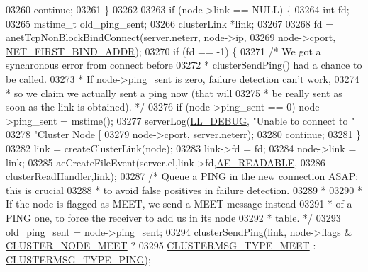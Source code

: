 \begin{DoxyCode}
{{{{{{{{{{{{{{{{{{{{{{{{{{{{{{{{{{{{{{{{{{{{{{{{{{{{{{{{{03260             \textcolor{keywordflow}{continue};
03261         \}
03262 
03263         \textcolor{keywordflow}{if} (node->link == NULL) \{
03264             \textcolor{keywordtype}{int} fd;
03265             mstime\_t old\_ping\_sent;
03266             clusterLink *link;
03267 
03268             fd = anetTcpNonBlockBindConnect(server.neterr, node->ip,
03269                 node->cport, \hyperlink{server_8h_a53b900c09238a4ff78e0af9574335dfd}{NET\_FIRST\_BIND\_ADDR});
03270             \textcolor{keywordflow}{if} (fd == -1) \{
03271                 \textcolor{comment}{/* We got a synchronous error from connect before}
03272 \textcolor{comment}{                 * clusterSendPing() had a chance to be called.}
03273 \textcolor{comment}{                 * If node->ping\_sent is zero, failure detection can't work,}
03274 \textcolor{comment}{                 * so we claim we actually sent a ping now (that will}
03275 \textcolor{comment}{                 * be really sent as soon as the link is obtained). */}
03276                 \textcolor{keywordflow}{if} (node->ping\_sent == 0) node->ping\_sent = mstime();
03277                 serverLog(\hyperlink{server_8h_abcaffe365dee628fcf9fc90c69d534a1}{LL\_DEBUG}, \textcolor{stringliteral}{"Unable to connect to "}
03278                     \textcolor{stringliteral}{"Cluster Node [%
03279                     node->cport, server.neterr);
03280                 \textcolor{keywordflow}{continue};
03281             \}
03282             link = createClusterLink(node);
03283             link->fd = fd;
03284             node->link = link;
03285             aeCreateFileEvent(server.el,link->fd,\hyperlink{ae_8h_a7a9a2162d007d09739955b4e55c65bf3}{AE\_READABLE},
03286                     clusterReadHandler,link);
03287             \textcolor{comment}{/* Queue a PING in the new connection ASAP: this is crucial}
03288 \textcolor{comment}{             * to avoid false positives in failure detection.}
03289 \textcolor{comment}{             *}
03290 \textcolor{comment}{             * If the node is flagged as MEET, we send a MEET message instead}
03291 \textcolor{comment}{             * of a PING one, to force the receiver to add us in its node}
03292 \textcolor{comment}{             * table. */}
03293             old\_ping\_sent = node->ping\_sent;
03294             clusterSendPing(link, node->flags & \hyperlink{cluster_8h_ad992a5c70af8bc805aae5405106ff9f7}{CLUSTER\_NODE\_MEET} ?
03295                     \hyperlink{cluster_8h_aaf264f57ae1869c57093fd9fbc6fc5bc}{CLUSTERMSG\_TYPE\_MEET} : 
      \hyperlink{cluster_8h_aeb8a936505e22f64e5039523a3c96d4c}{CLUSTERMSG\_TYPE\_PING});
}}}}}}}}}}}}}}}}}}}}}}}}}}}}}}}}}}}}}}}}}}}}}}}}}}}}}}}}}}
\end{DoxyCode}
